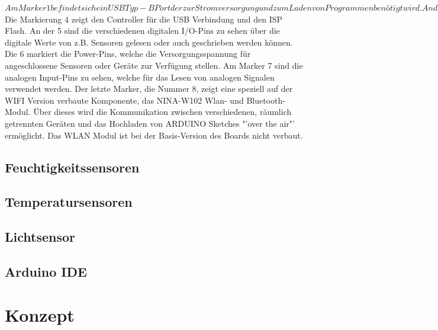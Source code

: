 \documentclass[
    load-dhbw-templates,
    load-preamble = true,
    auto-intro-pages = all,
    add-tocs-to-toc,
    debug = true,
    language = english,
    mainlanguage = ngerman,
    add-bibliography,
    bib-file = dhbw-source.bib,
    biblatex/style = alphabetic, 
]{iodhbwm}
\begin{document}
        $Am Marker 1 befindet sich ein USB Typ-B Port der zur Stromversorgung und zum Laden von Programmen benötigt wird.
        An der 2. Markierung ist die separate Stromversorgung zu sehen. Das Board kann über diesen mit 6-20V betrieben werden. Konkret kommt dafür ein Netzgerät oder auch eine mobile Powerbank in Betracht.
        Der Marker 3 zeigt auf den zentralen Chip des Boards, den Mikroprozessor ATmega4809, welcher mit Taktraten von 16MHz arbeitet.$
        Die Markierung 4 zeigt den Controller für die USB Verbindung und den ISP Flash.
        An der 5 sind die verschiedenen digitalen I/O-Pins zu sehen über die digitale Werte von z.B. Sensoren gelesen oder auch geschrieben werden können.
        Die 6 markiert die Power-Pins, welche die Versorgungsspannung für angeschlossene Sensoren oder Geräte zur Verfügung stellen.
        Am Marker 7 sind die analogen Input-Pins zu sehen, welche für das Lesen von analogen Signalen verwendet werden.
        Der letzte Marker, die Nummer 8, zeigt eine speziell auf der WIFI Version verbaute Komponente, das NINA-W102 Wlan- und Bluetooth-Modul. Über dieses wird die Kommunikation zwischen verschiedenen, räumlich getrennten Geräten und das Hochladen von ARDUINO Sketches "'over the air"' ermöglicht.
        Das WLAN Modul ist bei der Basis-Version des Boards nicht verbaut.

        \subsection{Feuchtigkeitssensoren}



        
        \subsection{Temperatursensoren}
        \subsection{Lichtsensor}
        \subsection{Arduino IDE}
    \section{Konzept}
\end{document}
